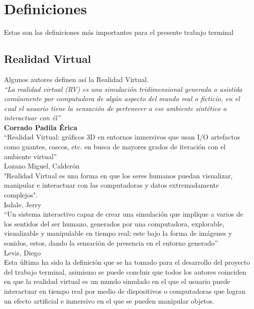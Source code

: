 \section{Definiciones}
Estas son las definiciones más importantes para el presente trabajo terminal

\subsection{Realidad Virtual}
Algunos autores definen así la Realidad Virtual.\\
\newline
\textit{“La realidad virtual (RV) es una simulación tridimensional generada o asistida comúnmente por computadora de algún aspecto del mundo real o ficticio, en el cual el usuario tiene la sensación de pertenecer a ese ambiente sintético o interactuar con él”}\cite{web6}\\ 
\textbf{Corrado Padila Érica}\\
\newline
“Realidad Virtual: gráficos 3D en entornos inmersivos que usan I/O
artefactos como guantes, cascos, etc. en busca de mayores grados de iteración
con el ambiente virtual”\cite{web7}\\ 
Lozano Miguel, Calderón\\
\newline
"Realidad Virtual es una forma en que los seres humanos puedan
visualizar, manipular e interactuar con las computadoras y datos extremadamente
complejos".\cite{web8}\\
Isdale, Jerry\\
\newline
“Un sistema interactivo capaz de crear una simulación que implique a varios de los sentidos del ser humano, generados por una computadora, explorable, visualizable y manipulable en tiempo real; este bajo la forma de imágenes y sonidos, estos, dando la sensación de presencia en el entorno generado”\cite{web9}\\
Levis, Diego\\
\newline
Esta última ha sido la definición que se ha tomado para el desarrollo del proyecto del trabajo terminal, asimismo se puede concluir que todos los autores coinciden en que la realidad virtual es un mundo simulado en el que el usuario puede interactuar en tiempo real por medio
de dispositivos o computadoras que logran un efecto artificial e inmersivo en el que se pueden manipular objetos.


